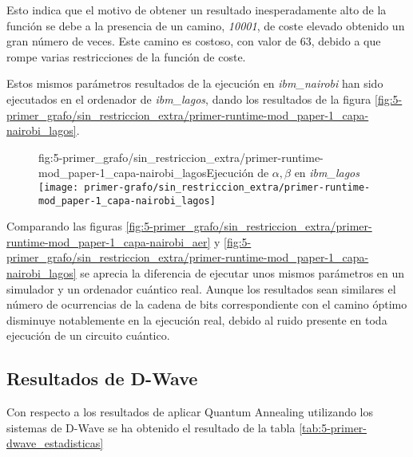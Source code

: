 Esto indica que el motivo de obtener un resultado inesperadamente alto de la función se debe a la presencia de un camino, \textit{10001}, de coste elevado obtenido un gran número de veces. Este camino es costoso, con valor de 63, debido a que rompe varias restricciones de la función de coste.

Estos mismos parámetros resultados de la ejecución en \textit{ibm\_nairobi} han sido ejecutados en el ordenador de \textit{ibm\_lagos}, dando los resultados de la figura \ref{fig:5-primer_grafo/sin_restriccion_extra/primer-runtime-mod_paper-1_capa-nairobi_lagos}.
\begin{figure}[htbp]{fig:5-primer_grafo/sin_restriccion_extra/primer-runtime-mod_paper-1_capa-nairobi_lagos}{Ejecución de \(\alpha, \beta\) en \textit{ibm\_lagos}}
  \centering
  \texttt{[image: primer-grafo/sin\_restriccion\_extra/primer-runtime-mod\_paper-1\_capa-nairobi\_lagos]}
\end{figure}

Comparando las figuras
\ref{fig:5-primer_grafo/sin_restriccion_extra/primer-runtime-mod_paper-1_capa-nairobi_aer}
y \ref{fig:5-primer_grafo/sin_restriccion_extra/primer-runtime-mod_paper-1_capa-nairobi_lagos}
se aprecia la diferencia de ejecutar unos mismos parámetros en un simulador y un ordenador cuántico real. Aunque los resultados sean similares el número de ocurrencias de la cadena de bits correspondiente con el camino óptimo disminuye notablemente en la ejecución real, debido al ruido presente en toda ejecución de un circuito cuántico.

\newpage


\subsection{Resultados de D-Wave}
Con respecto a los resultados de aplicar Quantum Annealing utilizando los sistemas de D-Wave se ha obtenido el resultado de la tabla \ref{tab:5-primer-dwave_estadisticas}

